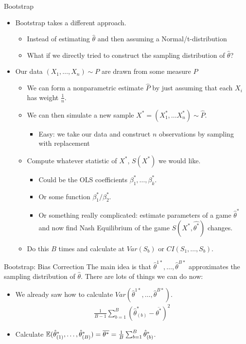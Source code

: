 \begin{frame}{Bootstrap}
\begin{itemize}
\item Bootstrap takes a different approach.
\begin{itemize}
\item Instead of estimating $\hat{\theta}$ and then assuming a Normal/t-distribution
\item What if we directly tried to construct the \alert{sampling distribution} of $\hat{\theta}$?
\end{itemize}
\item Our data $(X_1,\ldots,X_n) \sim P$ are drawn from some measure $P$
\begin{itemize}
\item We can form a \alert{nonparametric estimate} $\hat{P}$ by just assuming that each $X_i$ has weight $\frac{1}{n}$.
\item We can then simulate a new sample $X^{*} = (X_1^{*},\ldots X_n^{*}) \sim \hat{P}$.
\begin{itemize}
\item Easy: we take our data and construct $n$ observations by \alert{sampling with replacement} 
\end{itemize}
\item Compute whatever statistic of $X^{*}$, $S(X^*)$ we would like.
\begin{itemize}
\item Could be the OLS coefficients $\beta_1^{*},\ldots, \beta_k^{*}$.
\item Or some function $\beta_1^{*}/\beta_2^{*}$.
\item Or something really complicated: estimate parameters of a game $\hat{\theta}^*$ and now find Nash Equilibrium of the game $S(X^{*},\hat{\theta^*})$ changes.
\end{itemize}
\item Do this $B$ times and calculate at $Var(S_b)$ or $CI(S_1,\ldots, S_b)$.
\end{itemize}
\end{itemize}
\end{frame}


\begin{frame}{Bootstrap: Bias Correction}
\small
The main idea is that $\hat{\theta}^{1*},\ldots, \hat{\theta}^{B*}$ approximates the \alert{sampling distribution} of $\hat{\theta}$. There are lots of things we can do now:
\begin{itemize}
\item We already saw how to calculate $Var(\hat{\theta}^{1*},\ldots, \hat{\theta}^{B*})$.
\begin{eqnarray*}
\frac{1}{B-1} \sum_{b=1}^B (\hat{\theta}_{(b)}^* - \overline{\theta^{*}})^2
\end{eqnarray*}
\item Calculate $\mathbb{E}(\hat{\theta}^{*}_{(1)},\ldots, \hat{\theta}^{*}_{(B)}) = \overline{\theta^{*}} = \frac{1}{B} \sum_{b=1}^B \hat{\theta}_{(b)}^*$.
\end{itemize}
\end{frame}

